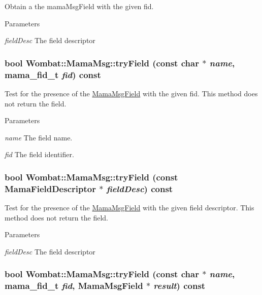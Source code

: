 Obtain a the mamaMsgField with the given fid. 
\begin{DoxyParams}{Parameters}
\item[{\em fieldDesc}]The field descriptor \end{DoxyParams}
\hypertarget{classWombat_1_1MamaMsg_aecb00c865c2f849cec333916cdc66292}{
\subsubsection[{tryField}]{\setlength{\rightskip}{0pt plus 5cm}bool Wombat::MamaMsg::tryField (const char $\ast$ {\em name}, \/  mama\_\-fid\_\-t {\em fid}) const}}
\label{classWombat_1_1MamaMsg_aecb00c865c2f849cec333916cdc66292}


Test for the presence of the \hyperlink{classWombat_1_1MamaMsgField}{MamaMsgField} with the given fid. This method does not return the field. 
\begin{DoxyParams}{Parameters}
\item[{\em name}]The field name. \item[{\em fid}]The field identifier. \end{DoxyParams}
\hypertarget{classWombat_1_1MamaMsg_abc084cb8d7ae285cf4a561fbe5041eac}{
\subsubsection[{tryField}]{\setlength{\rightskip}{0pt plus 5cm}bool Wombat::MamaMsg::tryField (const {\bf MamaFieldDescriptor} $\ast$ {\em fieldDesc}) const}}
\label{classWombat_1_1MamaMsg_abc084cb8d7ae285cf4a561fbe5041eac}


Test for the presence of the \hyperlink{classWombat_1_1MamaMsgField}{MamaMsgField} with the given field descriptor. This method does not return the field. 
\begin{DoxyParams}{Parameters}
\item[{\em fieldDesc}]The field descriptor \end{DoxyParams}
\hypertarget{classWombat_1_1MamaMsg_af2171e1fdddaef8d38394028b227c5e6}{
\subsubsection[{tryField}]{\setlength{\rightskip}{0pt plus 5cm}bool Wombat::MamaMsg::tryField (const char $\ast$ {\em name}, \/  mama\_\-fid\_\-t {\em fid}, \/  {\bf MamaMsgField} $\ast$ {\em result}) const}}
\label{classWombat_1_1MamaMsg_af2171e1fdddaef8d38394028b227c5e6}


